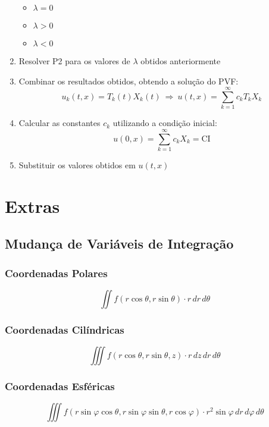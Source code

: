 \documentclass[11pt, a4paper]{article}
\begin{document}
\begin{enumerate}
          \begin{itemize}
              \item $\lambda = 0$
              \item $\lambda > 0$
              \item $\lambda < 0$
          \end{itemize}
    \item Resolver P2 para os valores de $\lambda$ obtidos anteriormente
    \item Combinar os resultados obtidos, obtendo a solução do PVF:
          \begin{equation*}
              u_k(t, x) = T_k(t) X_k(t) \ \Rightarrow \
              u(t,x) = \sum_{k=1}^{\infty} c_k T_k X_k
          \end{equation*}
    \item Calcular as constantes $c_k$ utilizando a condição inicial:
          \begin{equation*}
              u(0,x) = \sum_{k=1}^{\infty} c_k X_k = \text{CI}
          \end{equation*}
    \item Substituir os valores obtidos em $u(t,x)$
\end{enumerate}

\newpage

\section{Extras}

\subsection{Mudança de Variáveis de Integração}

\subsubsection{Coordenadas Polares}

\begin{equation*}
    \iint f(r\cos\theta, r\sin\theta) \cdot r\,dr\,d\theta
\end{equation*}

\subsubsection{Coordenadas Cilíndricas}

\begin{equation*}
    \iiint f(r\cos\theta, r\sin\theta, z) \cdot r\,dz\,dr\,d\theta
\end{equation*}

\subsubsection{Coordenadas Esféricas}

\begin{equation*}
    \iiint f(r\sin\varphi\cos\theta, r\sin\varphi\sin\theta, r\cos\varphi) \cdot r^2\sin\varphi\,dr\,d\varphi\,d\theta
\end{equation*}
\end{document}

